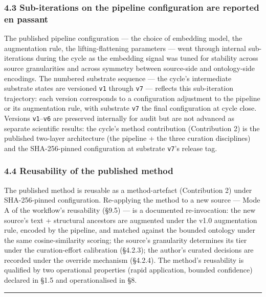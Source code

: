 \documentclass[
]{article}
\begin{document}
\subsubsection{4.3 Sub-iterations on the pipeline configuration are
reported en
passant}\label{sub-iterations-on-the-pipeline-configuration-are-reported-en-passant}

The published pipeline configuration --- the choice of embedding model,
the augmentation rule, the lifting-flattening parameters --- went
through internal sub-iterations during the cycle as the embedding signal
was tuned for stability across source granularities and across symmetry
between source-side and ontology-side encodings. The numbered substrate
sequence --- the cycle's intermediate substrate states are versioned
\texttt{v1} through \texttt{v7} --- reflects this sub-iteration
trajectory: each version corresponds to a configuration adjustment to
the pipeline or its augmentation rule, with substrate \texttt{v7} the
final configuration at cycle close. Versions \texttt{v1}--\texttt{v6}
are preserved internally for audit but are not advanced as separate
scientific results: the cycle's method contribution (Contribution 2) is
the published two-layer architecture (the pipeline + the three curation
disciplines) and the SHA-256-pinned configuration at substrate
\texttt{v7}'s release tag.

\subsubsection{4.4 Reusability of the published
method}\label{reusability-of-the-published-method}

The published method is reusable as a method-artefact (Contribution 2)
under SHA-256-pinned configuration. Re-applying the method to a new
source --- Mode A of the workflow's reusability (§9.5) --- is a
documented re-invocation: the new source's text + structural ancestors
are augmented under the v1.0 augmentation rule, encoded by the pipeline,
and matched against the bounded ontology under the same
cosine-similarity scoring; the source's granularity determines its tier
under the curation-effort calibration (§4.2.3); the author's curated
decisions are recorded under the override mechanism (§4.2.4). The
method's reusability is qualified by two operational properties (rapid
application, bounded confidence) declared in §1.5 and operationalised in
§8.

\begin{center}\rule{0.5\linewidth}{0.5pt}\end{center}
\end{document}
